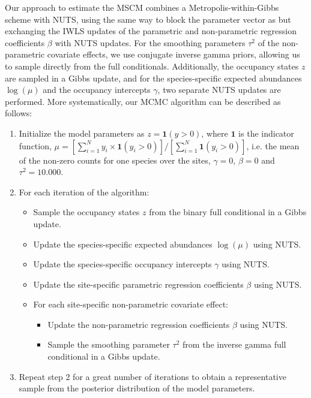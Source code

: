 \documentclass{article}
\begin{document}
Our approach to estimate the MSCM combines a Metropolis-within-Gibbs scheme with NUTS, using the same way to block the parameter vector as \citet{kleinCount2015} but exchanging the IWLS updates of the parametric and non-parametric regression coefficients $\beta$ with NUTS updates. For the smoothing parameters $\tau^2$ of the non-parametric covariate effects, we use conjugate inverse gamma priors, allowing us to sample directly from the full conditionals. Additionally, the occupancy states $z$ are sampled in a Gibbs update, and for the species-specific expected abundances $\log(\mu)$ and the occupancy intercepts $\gamma$, two separate NUTS updates are performed. More systematically, our MCMC algorithm can be described as follows:

\begin{enumerate}
\item Initialize the model parameters as $z = \bm{1}(y > 0)$, where $\bm{1}$ is the indicator function, $\mu = [\sum_{i=1}^N y_i \times \bm{1}(y_i > 0)] / [\sum_{i=1}^N \bm{1}(y_i > 0)]$, i.e. the mean of the non-zero counts for one species over the sites, $\gamma = 0$, $\beta = 0$ and $\tau^2 = 10.000$.
\item For each iteration of the algorithm:
  \begin{itemize}
  \item Sample the occupancy states $z$ from the binary full conditional in a Gibbs update.
  \item Update the species-specific expected abundances $\log(\mu)$ using NUTS.
  \item Update the species-specific occupancy intercepts $\gamma$ using NUTS.
  \item Update the site-specific parametric regression coefficients $\beta$ using NUTS.
  \item For each site-specific non-parametric covariate effect:
    \begin{itemize}
    \item Update the non-parametric regression coefficients $\beta$ using NUTS.
    \item Sample the smoothing parameter $\tau^2$ from the inverse gamma full conditional in a Gibbs update.
    \end{itemize}
  \end{itemize}
\item Repeat step 2 for a great number of iterations to obtain a representative sample from the posterior distribution of the model parameters.
\end{enumerate}
\end{document}
